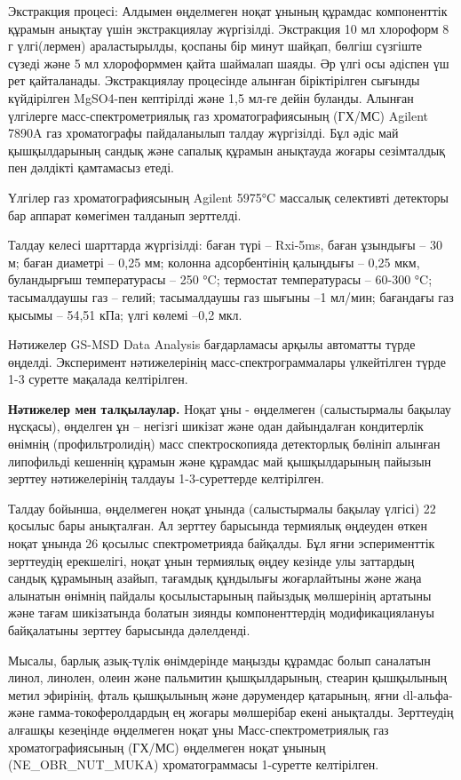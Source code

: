\begin{multicols}{2}
Экстракция процесі: Алдымен өңделмеген ноқат ұнының құрамдас
компоненттік құрамын анықтау үшін экстракциялау жүргізілді. Экстракция
10 мл хлороформ 8 г үлгі(лермен) араластырылды, қоспаны бір минут
шайқап, бөлгіш сүзгіште сүзеді және 5 мл хлороформмен қайта шаймалап
шаяды. Әр үлгі осы әдіспен үш рет қайталанады. Экстракциялау процесінде
алынған біріктірілген сығынды күйдірілген MgSO4-пен кептірілді және 1,5
мл-ге дейін буланды. Алынған үлгілерге масс-спектрометриялық газ
хроматографиясының (ГХ/МС) Agilent 7890A газ хроматографы пайдаланылып
талдау жүргізілді. Бұл әдіс май қышқылдарының сандық және сапалық
құрамын анықтауда жоғары сезімталдық пен дәлдікті қамтамасыз етеді.

Үлгілер газ хроматографиясының Agilent 5975°C массалық селективті
детекторы бар аппарат көмегімен талданып зерттелді.

Талдау келесі шарттарда жүргізілді: баған түрі -- Rxi-5ms, баған
ұзындығы -- 30 м; баған диаметрі -- 0,25 мм; колонна адсорбентінің
қалыңдығы -- 0,25 мкм, буландырғыш температурасы -- 250 °C; термостат
температурасы -- 60-300 °C; тасымалдаушы газ -- гелий; тасымалдаушы газ
шығыны --1 мл/мин; бағандағы газ қысымы -- 54,51 кПа; үлгі көлемі --0,2
мкл.

Нәтижелер GS-MSD Data Analysis бағдарламасы арқылы автоматты түрде
өңделді. Эксперимент нәтижелерінің масс-спектрограммалары үлкейтілген
түрде 1-3 суретте мақалада келтірілген.

{\bfseries Нәтижелер мен талқылаулар.} Ноқат ұны - өңделмеген (салыстырмалы бақылау нұсқасы), өңделген ұн --
негізгі шикізат және одан дайындалған кондитерлік өнімнің
(профильтролидің) масс спектроскопияда детекторлық бөлініп алынған
липофильді кешеннің құрамын және құрамдас май қышқылдарының пайызын
зерттеу нәтижелерінің талдауы 1-3-суреттерде келтірілген.

Талдау бойынша, өңделмеген ноқат ұнында (салыстырмалы бақылау үлгісі) 22
қосылыс бары анықталған. Ал зерттеу барысында термиялық өңдеуден өткен
ноқат ұнында 26 қосылыс спектрометрияда байқалды. Бұл яғни эсперименттік
зерттеудің ерекшелігі, ноқат ұнын термиялық өңдеу кезінде улы заттардың
сандық құрамының азайып, тағамдық құндылығы жоғарлайтыны және жаңа
алынатын өнімнің пайдалы қосылыстарының пайыздық мөлшерінің артатыны
және тағам шикізатында болатын зиянды компоненттердің модификациялануы
байқалатыны зерттеу барысында дәлелденді.

Мысалы, барлық азық-түлік өнімдерінде маңызды құрамдас болып саналатын
линол, линолен, олеин және пальмитин қышқылдарының, стеарин қышқылының
метил эфирінің, фталь қышқылының және дәрумендер қатарының, яғни
dl-альфа- және гамма-токоферолдардың ең жоғары мөлшерібар екені
анықталды. Зерттеудің алғашқы кезеңінде өңделмеген ноқат ұны
Масс-спектрометриялық газ хроматографиясының (ГХ/МС) өңделмеген ноқат
ұнының (NE\_OBR\_NUT\_MUKA) хроматограммасы 1-суретте келтірілген.



\end{multicols}
